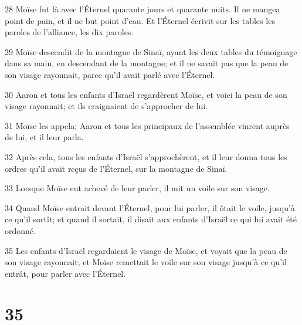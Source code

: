 \par 28 Moïse fut là avec l'Éternel quarante jours et quarante nuits. Il ne mangea point de pain, et il ne but point d'eau. Et l'Éternel écrivit sur les tables les paroles de l'alliance, les dix paroles.
\par 29 Moïse descendit de la montagne de Sinaï, ayant les deux tables du témoignage dans sa main, en descendant de la montagne; et il ne savait pas que la peau de son visage rayonnait, parce qu'il avait parlé avec l'Éternel.
\par 30 Aaron et tous les enfants d'Israël regardèrent Moïse, et voici la peau de son visage rayonnait; et ils craignaient de s'approcher de lui.
\par 31 Moïse les appela; Aaron et tous les principaux de l'assemblée vinrent auprès de lui, et il leur parla.
\par 32 Après cela, tous les enfants d'Israël s'approchèrent, et il leur donna tous les ordres qu'il avait reçus de l'Éternel, sur la montagne de Sinaï.
\par 33 Lorsque Moïse eut achevé de leur parler, il mit un voile sur son visage.
\par 34 Quand Moïse entrait devant l'Éternel, pour lui parler, il ôtait le voile, jusqu'à ce qu'il sortît; et quand il sortait, il disait aux enfants d'Israël ce qui lui avait été ordonné.
\par 35 Les enfants d'Israël regardaient le visage de Moïse, et voyait que la peau de son visage rayonnait; et Moïse remettait le voile sur son visage jusqu'à ce qu'il entrât, pour parler avec l'Éternel.

\chapter{35}

